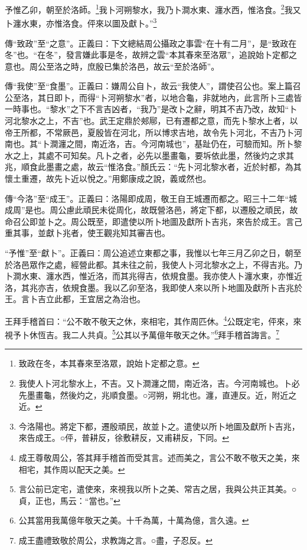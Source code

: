 予惟乙卯，朝至於洛師。\footnote{致政在冬，本其春來至洛眾，說始卜定都之意。}我卜河朔黎水，我乃卜澗水東、瀍水西，惟洛食。\footnote{我使人卜河北黎水上，不吉。又卜澗瀍之間，南近洛，吉。今河南城也。卜必先墨畫龜，然後灼之，兆順食墨。○河朔，朔北也。瀍，直連反。近，附近之近。}我又卜瀍水東，亦惟洛食。伻來以圖及獻卜。”\footnote{今洛陽也。將定下都，遷殷頑民，故並卜之。遣使以所卜地圖及獻所卜吉兆，來告成王。○伻，普耕反，徐敷耕反，又甫耕反，下同。}


{\noindent\zhuan{}\fzbyks 傳“致政”至“之意”。正義曰：下文總結周公攝政之事雲“在十有二月”，是“致政在冬”也。“在冬”，發言嫌此事是冬，故辨之雲“本其春來至洛眾”，追說始卜定都之意也。周公至洛之時，庶殷已集於洛邑，故云“至於洛師”。 \par}

{\noindent\zhuan{}\fzbyks 傳“我使”至“食墨”。正義曰：嫌周公自卜，故云“我使人”，謂使召公也。案上篇召公至洛，其日即卜，而得“卜河朔黎水”者，以地合龜，非就地內，此言所卜三處皆一時事也。“黎水”之下不言吉凶者，“我乃”是改卜之辭，明其不吉乃改，故知“卜河北黎水之上，不吉”也。武王定鼎於郟鄏，已有遷都之意，而先卜黎水上者，以帝王所都，不常厥邑，夏殷皆在河北，所以博求吉地，故令先卜河北，不吉乃卜河南也。其“卜澗瀍之間，南近洛，吉。今河南城也”，基趾仍在，可驗而知。所卜黎水之上，其處不可知矣。凡卜之者，必先以墨畫龜，要坼依此墨，然後灼之求其兆，順食此墨畫之處，故云“惟洛食。”顏氏云：“先卜河北黎水者，近於紂都，為其懷土重遷，故先卜近以悅之。”用鄭康成之說，義或然也。 \par}

{\noindent\zhuan{}\fzbyks 傳“今洛”至“成王”。正義曰：洛陽即成周，敬王自王城遷而都之。昭三十二年“城成周”是也。周公慮此頑民未從周化，故既營洛邑，將定下都，以遷殷之頑民，故命召公即並卜之。周公既至，即遣使以所卜地圖及獻所卜吉兆，來告於成王。言己重其事，並獻卜兆者，使王觀兆知其審吉也。 \par}

{\noindent\shu{}\fzkt “予惟”至“獻卜”。正義曰：周公追述立東都之事，我惟以七年三月乙卯之日，朝至於洛邑眾作之處，經營此都。其未往之前，我使人卜河北黎水之上，不得吉兆。乃卜澗水東、瀍水西，惟近洛，而其兆得吉，依規食墨。我亦使人卜瀍水東，亦惟近洛，其兆亦吉，依規食墨。我以乙卯至洛，我即使人來以所卜地圖及獻所卜吉兆於王。言卜吉立此都，王宜居之為治也。 \par}

王拜手稽首曰：“公不敢不敬天之休，來相宅，其作周匹休。\footnote{成王尊敬周公，答其拜手稽首而受其言。述而美之，言公不敢不敬天之美，來相宅，其作周以配天之美。}公既定宅，伻來，來視予卜休恆吉。我二人共貞。\footnote{言公前已定宅，遣使來，來視我以所卜之美、常吉之居，我與公共正其美。○貞，正也，馬云：“當也。”}公其以予萬億年敬天之休。”\footnote{公其當用我萬億年敬天之美。十千為萬，十萬為億，言久遠。}拜手稽首誨言。\footnote{成王盡禮致敬於周公，求教誨之言。○盡，子忍反。}


